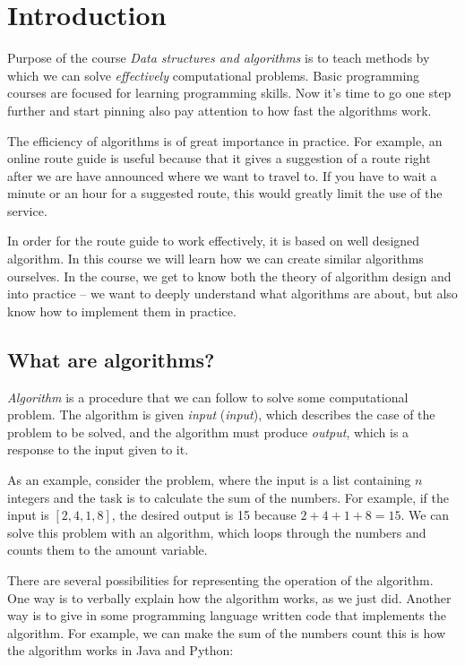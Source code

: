 \chapter{Introduction}

Purpose of the course \emph{Data structures and algorithms}
is to teach methods by which we can solve
\emph{effectively} computational problems.
Basic programming courses are focused
for learning programming skills.
Now it's time to go one step further and start pinning
also pay attention to how fast the algorithms work.

The efficiency of algorithms is of great importance in practice.
For example, an online route guide is useful because
that it gives a suggestion of a route right after we are
have announced where we want to travel to.
If you have to wait a minute or an hour for a suggested route,
this would greatly limit the use of the service.

In order for the route guide to work effectively, it is based on
well designed algorithm.
In this course we will learn how we can create similar algorithms ourselves.
In the course, we get to know both the theory of algorithm design and
into practice -- we want to deeply understand what algorithms are about,
but also know how to implement them in practice.

\section{What are algorithms?}


\emph{Algorithm} is a procedure that we can follow to solve
some computational problem.
The algorithm is given \emph{input} (\emph{input}),
which describes the case of the problem to be solved,
and the algorithm must produce \emph{output},
which is a response to the input given to it.

As an example, consider the problem,
where the input is a list containing $n$ integers and
the task is to calculate the sum of the numbers.
For example, if the input is $[2,4,1,8]$,
the desired output is 15 because $2+4+1+8=15$.
We can solve this problem with an algorithm,
which loops through the numbers and counts them
to the amount variable.

There are several possibilities for representing the operation of the algorithm.
One way is to verbally explain how the algorithm works,
as we just did.
Another way is to give in some programming language
written code that implements the algorithm.
For example, we can make the sum of the numbers count
this is how the algorithm works in Java and Python:

